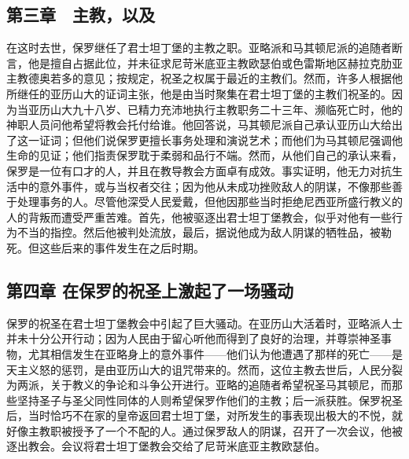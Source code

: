
\subsection{第三章　主教，以及}

在这时去世，保罗继任了君士坦丁堡的主教之职。亚略派和马其顿尼派的追随者断言，他是擅自占据此位，并未征求尼苛米底亚主教欧瑟伯或色雷斯地区赫拉克肋亚主教德奥若多的意见；按规定，祝圣之权属于最近的主教们。然而，许多人根据他所继任的亚历山大的证词主张，他是由当时聚集在君士坦丁堡的主教们祝圣的。因为当亚历山大九十八岁、已精力充沛地执行主教职务二十三年、濒临死亡时，他的神职人员问他希望将教会托付给谁。他回答说，马其顿尼派自己承认亚历山大给出了这一证词；但他们说保罗更擅长事务处理和演说艺术；而他们为马其顿尼强调他生命的见证；他们指责保罗耽于柔弱和品行不端。然而，从他们自己的承认来看，保罗是一位有口才的人，并且在教导教会方面卓有成效。事实证明，他无力对抗生活中的意外事件，或与当权者交往；因为他从未成功挫败敌人的阴谋，不像那些善于处理事务的人。尽管他深受人民爱戴，但他因那些当时拒绝尼西亚所盛行教义的人的背叛而遭受严重苦难。首先，他被驱逐出君士坦丁堡教会，似乎对他有一些行为不当的指控。然后他被判处流放，最后，据说他成为敌人阴谋的牺牲品，被勒死。但这些后来的事件发生在之后时期。\par


\subsection{第四章 在保罗的祝圣上激起了一场骚动}

保罗的祝圣在君士坦丁堡教会中引起了巨大骚动。在亚历山大活着时，亚略派人士并未十分公开行动；因为人民由于留心听他而得到了良好的治理，并尊崇神圣事物，尤其相信发生在亚略身上的意外事件——他们认为他遭遇了那样的死亡——是天主义怒的惩罚，是由亚历山大的诅咒带来的。然而，这位主教去世后，人民分裂为两派，关于教义的争论和斗争公开进行。亚略的追随者希望祝圣马其顿尼，而那些坚持圣子与圣父同性同体的人则希望保罗作他们的主教；后一派获胜。保罗祝圣后，当时恰巧不在家的皇帝返回君士坦丁堡，对所发生的事表现出极大的不悦，就好像主教职被授予了一个不配的人。通过保罗敌人的阴谋，召开了一次会议，他被逐出教会。会议将君士坦丁堡教会交给了尼苛米底亚主教欧瑟伯。\par

